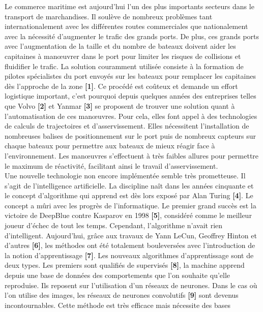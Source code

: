 \documentclass[12pt,a4paper]{extarticle}
\begin{document}
\indent Le commerce maritime est aujourd'hui l'un des plus importants secteurs dans le 
transport de marchandises. Il soulève de nombreux problèmes tant internationalement avec 
les différentes routes commerciales que nationalement avec la nécessité 
d'augmenter le trafic des grands ports. De plus, ces grands ports 
avec l'augmentation de la taille et du nombre de bateaux doivent aider les capitaines 
à manœuvrer dans le port pour limiter les risques de collisions et fluidifier le trafic.
La solution couramment utilisée consiste à la formation de pilotes spécialistes du port envoyés sur 
les bateaux pour remplacer les capitaines dès l'approche de la zone {\bfseries [1]}. Ce procédé est coûteux 
et demande un effort logistique important, c'est pourquoi depuis quelques années des 
entreprises telles que Volvo {\bfseries [2]} et Yanmar {\bfseries [3]} se proposent de trouver une solution quant à 
l'automatisation de ces manœuvres. Pour cela, elles font appel à des technologies de 
calculs de trajectoires et d'asservissement. Elles nécessitent l'installation de nombreuses balises de 
positionnement sur le port puis de nombreux capteurs sur chaque bateaux 
pour permettre aux bateaux de mieux réagir face à l'environnement. Les manœuvres 
s'effectuent à très faibles allures pour permettre le maximum de réactivité, 
facilitant ainsi le travail d'asservissement. \\
\indent Une nouvelle technologie non encore implémentée semble très prometteuse. 
Il s'agit de l'intelligence artificielle. La discipline naît dans les années
cinquante et le concept d'algorithme qui apprend est dès lors exposé par Alan Turing {\bfseries [4]}.
Le concept a mûri avec les progrès de l'informatique. Le premier grand succès est la 
victoire de DeepBlue contre Kasparov en 1998 {\bfseries [5]}, considéré comme le meilleur joueur d'échec 
de tout les temps. Cependant, l'algorithme n'avait rien d'intelligent. Aujourd'hui, 
grâce aux travaux de Yann LeCun, Geoffrey Hinton et d'autres {\bfseries [6]}, les méthodes ont été 
totalement bouleversées avec l'introduction de la notion d'apprentissage {\bfseries [7]}.
Les nouveaux algorithmes d'apprentissage sont de deux types. Les premiers sont qualifiés de supervisés {\bfseries [8]},
la machine apprend depuis une base de données des comportements que
l'on souhaite qu'elle reproduise. Ils reposent sur l'utilisation d'un réseaux 
de neurones. Dans le cas où l'on utilise des images, les réseaux de neurones convolutifs {\bfseries [9]}
sont devenus incontournables. Cette méthode est très efficace mais nécessite des bases 
\end{document}

